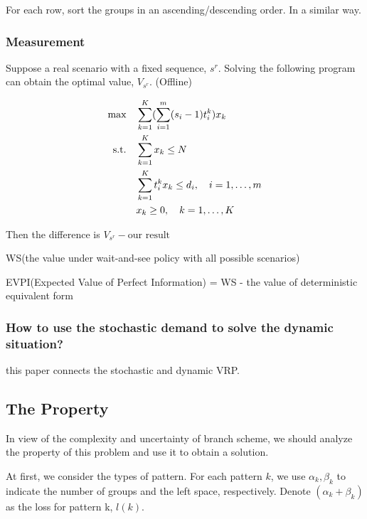 For each row, sort the groups in an ascending/descending order. In a similar way.

\subsubsection{Measurement}

Suppose a real scenario with a fixed sequence, $s^{r}$. Solving the following program can obtain the optimal value, $V_{s^{r}}$. (Offline)

\begin{equation*}
\begin{aligned}
  \mbox{max}\quad & \sum_{k=1}^K(\sum_{i=1}^m (s_i-1)t_i^k) x_{k} \\
  \mbox{s.t.} \quad & \sum_{k=1}^K x_{k} \leq N \\
  & \sum_{k=1}^K t_i^k x_k \leq d_i,\quad i=1,\ldots,m \\
  & x_{k} \geq 0, \quad k = 1,\ldots,K \notag
\end{aligned}
\end{equation*}

Then the difference is $V_{s^{r}} - \text{our result}$

WS(the value under wait-and-see policy with all possible scenarios)

EVPI(Expected Value of Perfect Information) = WS - the value of deterministic equivalent form


\subsubsection{How to use the stochastic demand to solve the dynamic situation?}

\cite{bent2004scenario} this paper connects the stochastic and dynamic VRP.


\subsection{The Property}
In view of the complexity and uncertainty of branch scheme, we should analyze the property of this problem and use it to obtain a solution.

At first, we consider the types of pattern. For each pattern $k$, we use $\alpha_k, \beta_k$ to indicate the number of groups and the left space, respectively. Denote $(\alpha_k + \beta_k)$ as the loss for pattern k, $l(k)$.


